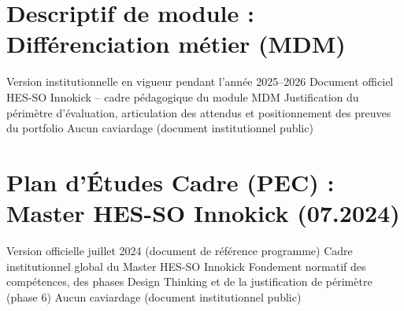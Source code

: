 



\chapter{Descriptif de module : Différenciation métier (MDM)}
\label{annex:descriptif-mdm}
\annexefiche
  {Version institutionnelle en vigueur pendant l'année 2025--2026}
  {Document officiel HES-SO Innokick -- cadre pédagogique du module MDM}
  {Justification du périmètre d'évaluation, articulation des attendus et positionnement des preuves du portfolio}
  {Aucun caviardage (document institutionnel public)}


\chapter{Plan d'Études Cadre (PEC) : Master HES-SO Innokick (07.2024)}
\label{annex:pec-innokick}
\annexefiche
  {Version officielle juillet 2024 (document de référence programme)}
  {Cadre institutionnel global du Master HES-SO Innokick}
  {Fondement normatif des compétences, des phases Design Thinking et de la justification de périmètre (phase 6)}
  {Aucun caviardage (document institutionnel public)}










